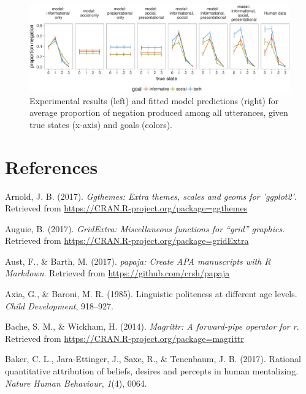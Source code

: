 \documentclass[floatsintext,man]{apa6}
\theoremstyle{definition}
\theoremstyle{definition}
\theoremstyle{definition}
\theoremstyle{remark}
\begin{document}
\begin{figure}[!h]
\includegraphics[width=\textwidth]{polite_NHB_files/figure-latex/negation-1} \caption{Experimental results (left) and fitted model predictions (right) for average proportion of negation produced among all utterances, given true states (x-axis) and goals (colors).}\label{fig:negation}
\end{figure}

\newpage

\section{References}\label{references}

\setlength{\parindent}{-0.5in} \setlength{\leftskip}{0.5in}

\hypertarget{refs}{}
\hypertarget{ref-R-ggthemes}{}
Arnold, J. B. (2017). \emph{Ggthemes: Extra themes, scales and geoms for
'ggplot2'}. Retrieved from
\url{https://CRAN.R-project.org/package=ggthemes}

\hypertarget{ref-R-gridExtra}{}
Auguie, B. (2017). \emph{GridExtra: Miscellaneous functions for ``grid''
graphics}. Retrieved from
\url{https://CRAN.R-project.org/package=gridExtra}

\hypertarget{ref-R-papaja}{}
Aust, F., \& Barth, M. (2017). \emph{papaja: Create APA manuscripts with
R Markdown}. Retrieved from \url{https://github.com/crsh/papaja}

\hypertarget{ref-axia1985}{}
Axia, G., \& Baroni, M. R. (1985). Linguistic politeness at different
age levels. \emph{Child Development}, 918--927.

\hypertarget{ref-R-magrittr}{}
Bache, S. M., \& Wickham, H. (2014). \emph{Magrittr: A forward-pipe
operator for r}. Retrieved from
\url{https://CRAN.R-project.org/package=magrittr}

\hypertarget{ref-baker2017rational}{}
Baker, C. L., Jara-Ettinger, J., Saxe, R., \& Tenenbaum, J. B. (2017).
Rational quantitative attribution of beliefs, desires and percepts in
human mentalizing. \emph{Nature Human Behaviour}, \emph{1}(4), 0064.
\end{document}
